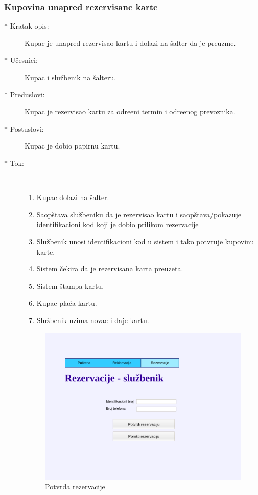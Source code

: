 \subsubsection{Kupovina unapred rezervisane karte}
\begin{description}
	\item[$\ast$ Kratak opis: ] Kupac je unapred rezervisao kartu i dolazi na \v salter da je preuzme.
	\item[$\ast$ U\v cesnici: ] Kupac i slu\v zbenik na \v salteru.
	\item[$\ast$ Preduslovi: ] Kupac je rezervisao kartu za odre\dj{}eni termin i odre\dj{}enog prevoznika.
	\item[$\ast$ Postuslovi: ] Kupac je dobio papirnu kartu.
	\item[$\ast$ Tok: ] \ \\
	\begin{enumerate}
		\item Kupac dolazi na \v salter.
		\item Saop\v stava slu\v zbeniku da je rezervisao kartu i saop\v stava/pokazuje identifikacioni kod koji je dobio prilikom rezervacije
		\item Slu\v zbenik unosi identifikacioni kod u sistem i tako potvr\dj{}uje kupovinu karte.
		\item Sistem \v cekira da je rezervisana karta preuzeta.
		\item Sistem \v stampa kartu.
		\item Kupac pla\'ca kartu.
		\item Slu\v zbenik uzima novac i daje kartu.
	\end{enumerate}
	
\begin{figure}[!htb] 
	\centering
	\includegraphics[width=1.2\linewidth]{../Slike/Veb/rezervacije_sluzbenik.png}
	\caption{Potvrda rezervacije}
	\label{fig:potvrda_karte}
\end{figure}
\end{description}

